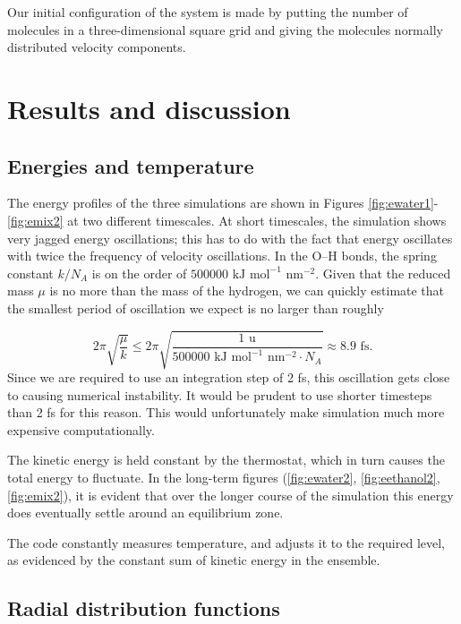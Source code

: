 \documentclass[11pt,a4paper]{article}
\begin{document}
Our initial configuration of the system is made by putting the number of molecules in a three-dimensional square grid and giving the molecules normally distributed velocity components. 

\section{Results and discussion}

\subsection{Energies and temperature}

The energy profiles of the three simulations are shown in Figures \ref{fig:ewater1}-\ref{fig:emix2} at two different timescales. At short timescales, the simulation shows very jagged energy oscillations; this has to do with the fact that energy oscillates with twice the frequency of velocity oscillations. In the O--H bonds, the spring constant $k/N_A$ is on the order of $500000 \text{ kJ}\text{ mol}^{-1}\text{ nm}^{-2}$. Given that the reduced mass $\mu$ is no more than the mass of the hydrogen, we can quickly estimate that the smallest period of oscillation we expect is no larger than roughly

\begin{equation}
2 \pi \sqrt{\frac{\mu}{k}} \leq 2 \pi \sqrt{\frac{1\text{ u}}{500000 \text{ kJ}\text{ mol}^{-1}\text{ nm}^{-2} \cdot N_A}} \approx 8.9\text{ fs}.
\end{equation}
Since we are required to use an integration step of 2 fs, this oscillation gets close to causing numerical instability. It would be prudent to use shorter timesteps than 2 fs for this reason. This would unfortunately make simulation much more expensive computationally. 

The kinetic energy is held constant by the thermostat, which in turn causes the total energy to fluctuate. In the long-term figures (\ref{fig:ewater2}, \ref{fig:eethanol2}, \ref{fig:emix2}), it is evident that over the longer course of the simulation this energy does eventually settle around an equilibrium zone. 

The code constantly measures temperature, and adjusts it to the required level, as evidenced by the constant sum of kinetic energy in the ensemble. 

\subsection{Radial distribution functions}
\end{document}
